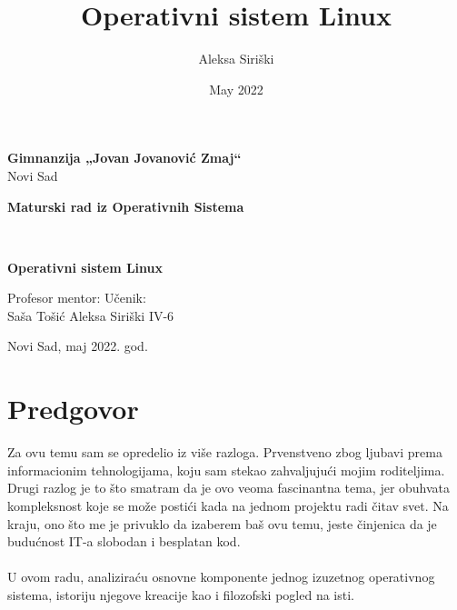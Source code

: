 \documentclass[a4paper,14pt]{article}
\title{Operativni sistem Linux}
\author{Aleksa Siriški}
\date{May 2022}
\begin{document}
\begin{center}
\textbf{Gimnanzija „Jovan Jovanović Zmaj“}
\\
Novi Sad
\end{center}
\vfill
\begin{center}
	\begin{large}
		\textbf{Maturski rad iz Operativnih Sistema}
		\bigskip 
	\end{large}
	\\
	\begin{huge}
        \textbf{Operativni sistem Linux}
	\end{huge}
\end{center}
\vfill
\begin{normalsize}
Profesor mentor:
\hfill
Učenik:
\\
Saša Tošić
\hfill
Aleksa Siriški IV-6
\end{normalsize}
\vfill
\begin{center}
Novi Sad, maj 2022. god.
\end{center}
\newpage

\section{Predgovor}
Za ovu temu sam se opredelio iz više razloga. Prvenstveno zbog ljubavi prema informacionim tehnologijama, koju sam stekao zahvaljujući mojim roditeljima. Drugi razlog je to što smatram da je ovo veoma fascinantna tema, jer obuhvata kompleksnost koje se može postići kada na jednom projektu radi čitav svet. Na kraju, ono što me je privuklo da izaberem baš ovu temu, jeste činjenica da je budućnost IT-a slobodan i besplatan kod.
\\\\
U ovom radu, analiziraću osnovne komponente jednog izuzetnog operativnog sistema, istoriju njegove kreacije kao i filozofski pogled na isti.
\newpage

\renewcommand{\contentsname}{Sadržaj}
\tableofcontents
\newpage

\pagestyle{fancy}
\fancyhf{}
\cfoot{\thepage}
\end{document}
